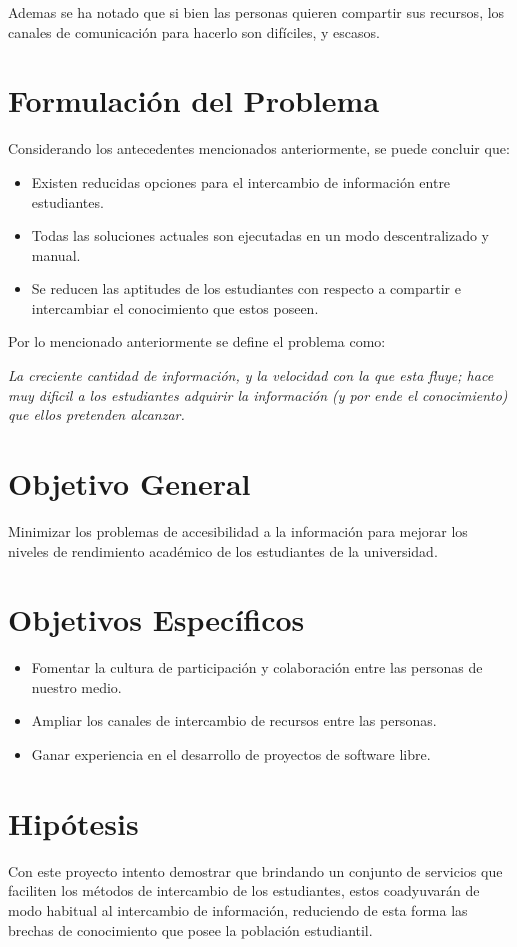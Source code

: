 \documentclass[letter,11pt,oneside,spanish]{article}
\begin{document}
Ademas se ha notado que si bien las personas quieren compartir sus recursos, los canales de
comunicación para hacerlo son difíciles, y escasos.

\section{Formulación del Problema}
Considerando los antecedentes mencionados anteriormente, se puede concluir que:

\begin{itemize}
\item Existen reducidas opciones para el intercambio de información entre estudiantes.
\item Todas las soluciones actuales son ejecutadas en un modo descentralizado y manual.
\item Se reducen las aptitudes de los estudiantes con respecto a compartir e intercambiar el
conocimiento que estos poseen.
\end{itemize}

Por lo mencionado anteriormente se define el problema como:

\emph{La creciente cantidad de información, y la velocidad con la que esta fluye; hace muy dificil
a los estudiantes adquirir la información (y por ende el conocimiento) que ellos pretenden
alcanzar.}

\section{Objetivo General}
Minimizar los problemas de accesibilidad a la información para mejorar los niveles de rendimiento
académico de los estudiantes de la universidad.

\section{Objetivos Específicos}
\begin{itemize}
\item Fomentar la cultura de participación y colaboración entre las personas de nuestro medio.
\item Ampliar los canales de intercambio de recursos entre las personas.
\item Ganar experiencia en el desarrollo de proyectos de software libre.
\end{itemize}

\section{Hipótesis}
Con este proyecto intento demostrar que brindando un conjunto de servicios que faciliten los métodos
de intercambio de los estudiantes, estos coadyuvarán de modo habitual al intercambio de información,
reduciendo de esta forma las brechas de conocimiento que posee la población estudiantil.
\end{document}
